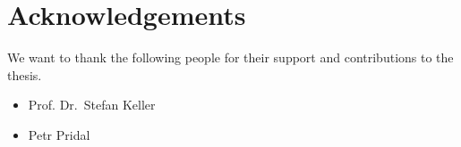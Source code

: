 

\bigskip


\begingroup

\let\clearpage\relax
\let\cleardoublepage\relax
\let\cleardoublepage\relax

\chapter*{Acknowledgements} %

We want to thank the following people for their support and contributions to the thesis.

\begin{itemize}
\item
  Prof. Dr.~Stefan Keller
\item
  Petr Pridal
\end{itemize}

\endgroup
